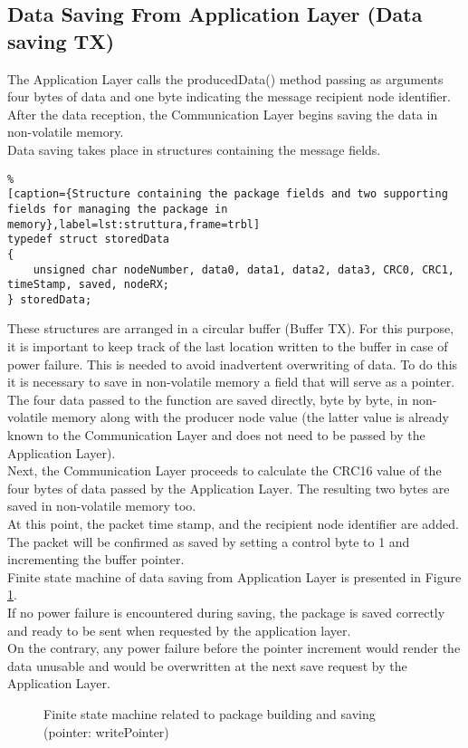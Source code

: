 \subsection{Data Saving From Application Layer (Data saving TX)}
\label{sec:CommLayer1}
The Application Layer calls the producedData() method passing as arguments four bytes of data and one byte indicating the message recipient node identifier.\\
After the data reception, the Communication Layer begins saving the data in non-volatile memory.\\ 
Data saving takes place in structures containing the message fields. 
\begin{lstlisting}%
[caption={Structure containing the package fields and two supporting fields for managing the package in memory},label=lst:struttura,frame=trbl]
typedef struct storedData
{
    unsigned char nodeNumber, data0, data1, data2, data3, CRC0, CRC1, timeStamp, saved, nodeRX;
} storedData;
\end{lstlisting}
These structures are arranged in a circular buffer (Buffer TX). 
For this purpose, it is important to keep track of the last location written to the buffer in case of power failure. 
This is needed to avoid inadvertent overwriting of data. 
To do this it is necessary to save in non-volatile memory a field that will serve as a pointer.\\
The four data passed to the function are saved directly, byte by byte, in non-volatile memory along with the producer node value (the latter value is already known to the Communication Layer and does not need to be passed by the Application Layer).\\
Next, the Communication Layer proceeds to calculate the CRC16 value of the four bytes of data passed by the Application Layer. The resulting two bytes are saved in non-volatile memory too.\\
At this point, the packet time stamp, and the recipient node identifier are added.\\
The packet will be confirmed as saved by setting a control byte to 1 and incrementing the buffer pointer.\\
Finite state machine of data saving from Application Layer is presented in Figure \ref{fig:FSMSAVETX}.\\
If no power failure is encountered during saving, the package is saved correctly and ready to be sent when requested by the application layer.\\
On the contrary, any power failure before the pointer increment would render the data unusable and would be overwritten at the next save request by the Application Layer.\\
\begin{figure}[H]
\centerline{}
\caption{\footnotesize \centering Finite state machine related to package building and saving (pointer: writePointer)}
\label{fig:FSMSAVETX}
\end{figure}

